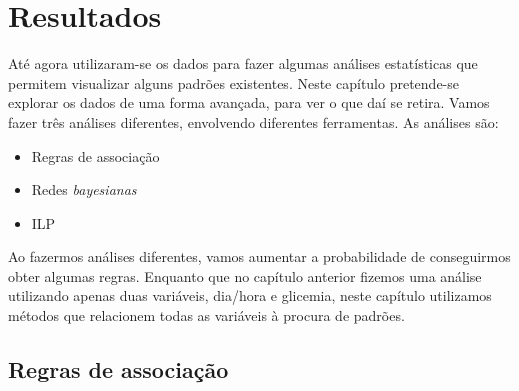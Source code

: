 \chapter{Resultados}\label{chap:results}

Até agora utilizaram-se os dados para fazer algumas análises estatísticas que permitem visualizar alguns padrões existentes. Neste capítulo pretende-se explorar os dados de uma forma avançada, para ver o que daí se retira. Vamos fazer três análises diferentes, envolvendo diferentes ferramentas. As análises são:

\begin{itemize}
\item Regras de associação
\item Redes \textit{bayesianas}
\item ILP
\end{itemize}

Ao fazermos análises diferentes, vamos aumentar a probabilidade de conseguirmos obter algumas regras. Enquanto que no capítulo anterior fizemos uma análise utilizando apenas duas variáveis, dia/hora e glicemia, neste capítulo utilizamos métodos que relacionem todas as variáveis à procura de padrões.


\section{Regras de associação}

